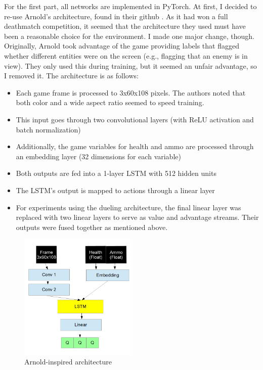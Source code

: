 \documentclass[letterpaper]{article}
\begin{document}
	For the first part, all networks are implemented in PyTorch. At first, I decided to re-use Arnold's architecture, found in their github \cite{lample2018}. As it had won a full deathmatch competition, it seemed that the architecture they used must have been a reasonable choice for the environment. I made one major change, though. Originally, Arnold took advantage of the game providing labels that flagged whether different entities were on the screen (e.g., flagging that an enemy is in view). They only used this during training, but it seemed an unfair advantage, so I removed it. The architecture is as follows:
	\begin{itemize}
		\item Each game frame is processed to 3x60x108 pixels. The authors noted that both color and a wide aspect ratio seemed to speed training.
		\item This input goes through two convolutional layers (with ReLU activation and batch normalization)
		\item Additionally, the game variables for health and ammo are processed through an embedding layer (32 dimensions for each variable)
		\item Both outputs are fed into a 1-layer LSTM with 512 hidden units
		\item The LSTM's output is mapped to actions through a linear layer
		\item For experiments using the dueling architecture, the final linear layer was replaced with two linear layers to serve as value and advantage streams. Their outputs were fused together as mentioned above.
	\end{itemize} 

	\begin{figure}[h!]
		\centering
		\includegraphics[width=0.5\textwidth]{Arch.png}
		\caption{Arnold-inspired architecture}
		\label{fig:ArnoldArch}
	\end{figure}
\end{document}
